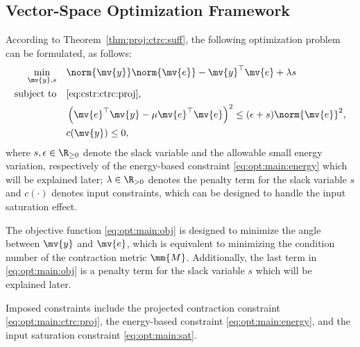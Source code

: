 \documentclass[lettersize,journal]{IEEEtran}
\begin{document}
\subsection{Vector-Space Optimization Framework} \label{sec:sub:vector:space:opt}

According to Theorem~\ref{thm:proj:ctrc:suff}, the following optimization problem can be formulated, as follows:
\begin{subequations} \label{eq:opt:main}
   \begin{align}
      \min_{
         \mv{y},s
         } 
         \quad &
      \norm{\mv{y}}\norm{\mv{e}} - \mv{y}^\top \mv{e}
      +
      \lambda s
      \label{eq:opt:main:obj}
      \\
      \text{subject to} 
      \quad &
         \eqref{eq:cstr:ctrc:proj}
         ,
         \label{eq:opt:main:ctrc:proj}
         \\ &
         \left(
            \mv{e}^\top \mv{y} 
            -
            \mu \mv{e}^\top \mv{e}
         \right)^2
         \le
         (\epsilon + s) \norm{\mv{e}}^2
         ,
         \label{eq:opt:main:energy}
         \\ &
         c(\mv{y}) \le 0
         ,
         \label{eq:opt:main:sat}
   \end{align}
\end{subequations}
where $s,\epsilon\in\R_{\ge0}$ denote the slack variable and the allowable small energy variation, respectively of the energy-based constraint \eqref{eq:opt:main:energy} which will be explained later; $\lambda\in\R_{>0}$ denotes the penalty term for the slack variable $s$ and $c(\cdot)$ denotes input constraints, which can be designed to handle the input saturation effect.

The objective function \eqref{eq:opt:main:obj} is designed to minimize the angle between $\mv{y}$ and $\mv{e}$, which is equivalent to minimizing the condition number of the contraction metric $\mm{M}$.
Additionally, the last term in \eqref{eq:opt:main:obj} is a penalty term for the slack variable $s$ which will be explained later.

Imposed constraints include the projected contraction constraint \eqref{eq:opt:main:ctrc:proj}, the energy-based constraint \eqref{eq:opt:main:energy}, and the input saturation constraint \eqref{eq:opt:main:sat}.
\end{document}
